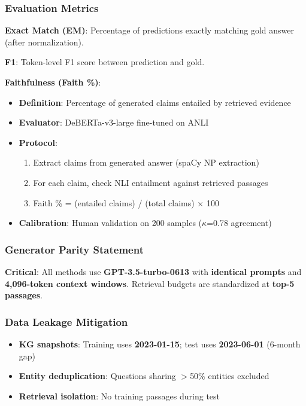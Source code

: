 \documentclass[10pt,twocolumn]{article}
\begin{document}
\subsubsection{Evaluation Metrics}
\label{sec:metrics}

\textbf{Exact Match (EM)}: Percentage of predictions exactly matching gold answer (after normalization).

\textbf{F1}: Token-level F1 score between prediction and gold.

\textbf{Faithfulness (Faith \%)}:
\begin{itemize}
    \item \textbf{Definition}: Percentage of generated claims entailed by retrieved evidence
    \item \textbf{Evaluator}: DeBERTa-v3-large \cite{he2021deberta} fine-tuned on ANLI
    \item \textbf{Protocol}:
    \begin{enumerate}
        \item Extract claims from generated answer (spaCy NP extraction)
        \item For each claim, check NLI entailment against retrieved passages
        \item Faith \% = (entailed claims) / (total claims) $\times$ 100
    \end{enumerate}
    \item \textbf{Calibration}: Human validation on 200 samples ($\kappa$=0.78 agreement)
\end{itemize}

\subsubsection{Generator Parity Statement}
\label{sec:generator_parity}

\textbf{Critical}: All methods use \textbf{GPT-3.5-turbo-0613} with \textbf{identical prompts} and \textbf{4,096-token context windows}. Retrieval budgets are standardized at \textbf{top-5 passages}.

\subsubsection{Data Leakage Mitigation}
\label{sec:leakage}
\begin{itemize}
    \item \textbf{KG snapshots}: Training uses \textbf{2023-01-15}; test uses \textbf{2023-06-01} (6-month gap)
    \item \textbf{Entity deduplication}: Questions sharing $>$50\% entities excluded
    \item \textbf{Retrieval isolation}: No training passages during test
\end{itemize}
\end{document}
